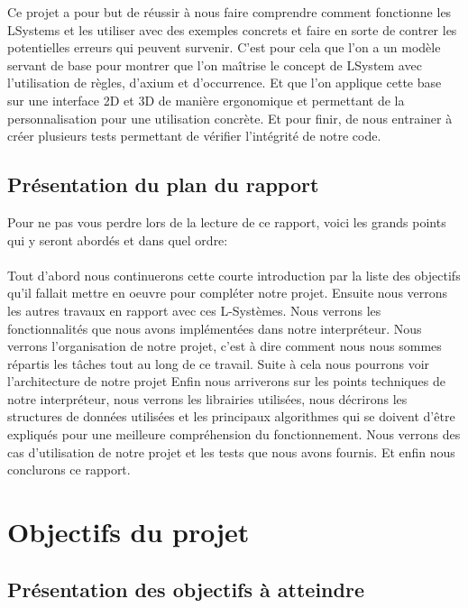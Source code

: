 \documentclass[a4paper,12pt]{article}
\begin{document}
Ce projet a pour but de réussir à nous faire comprendre comment fonctionne les LSystems et les utiliser avec des exemples concrets et faire en sorte de contrer les potentielles erreurs qui peuvent survenir. C'est pour cela que l'on a un modèle servant de base pour montrer que l'on maîtrise le concept de LSystem avec l'utilisation de règles, d'axium et d'occurrence. Et que l'on applique cette base sur une interface 2D et 3D de manière ergonomique et permettant de la personnalisation pour une utilisation concrète. Et pour finir, de nous entrainer à créer plusieurs tests permettant de vérifier l'intégrité de notre code.

\subsection{Présentation du plan du rapport}

Pour ne pas vous perdre lors de la lecture de ce rapport, voici les grands points qui y seront abordés et dans quel ordre:
\\\\
Tout d'abord nous continuerons cette courte introduction par la liste des objectifs qu'il fallait mettre en oeuvre pour compléter notre projet. 
Ensuite nous verrons les autres travaux en rapport avec ces L-Systèmes.
Nous verrons les fonctionnalités que nous avons implémentées dans notre interpréteur.
Nous verrons l'organisation de notre projet, c'est à dire comment nous nous sommes répartis les tâches tout au long de ce travail.
Suite à cela nous pourrons voir l'architecture de notre projet
Enfin nous arriverons sur les points techniques de notre interpréteur, nous verrons les librairies utilisées, nous décrirons les structures de données utilisées et les principaux algorithmes qui se doivent d'être expliqués pour une meilleure compréhension du fonctionnement.
Nous verrons des cas d'utilisation de notre projet et les tests que nous avons fournis.
Et enfin nous conclurons ce rapport.


\newpage
\section{Objectifs du projet}
\subsection{Présentation des objectifs à atteindre}
\end{document}
